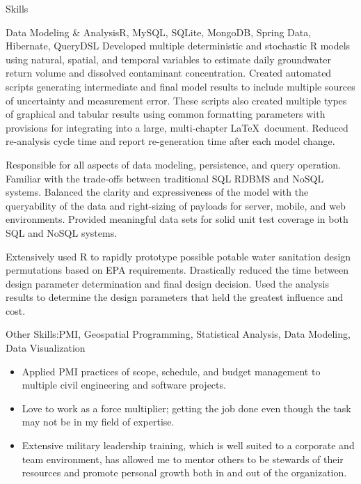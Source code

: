 \documentclass[]{mcdowellcv}
\begin{document}
\begin{cvsection}{Skills}
	\begin{cvsubsection2}{Data Modeling \& Analysis}{\textsf{R}, MySQL, SQLite, MongoDB, Spring Data, Hibernate, QueryDSL}
		 Developed multiple deterministic and stochastic \textsf{R} models using natural, spatial, and temporal variables to estimate daily groundwater return volume and dissolved contaminant concentration.  Created automated scripts generating intermediate and final model results to include multiple sources of uncertainty and measurement error.  These scripts also created multiple types of graphical and tabular results using common formatting parameters with provisions for integrating into a large, multi-chapter \LaTeX\ document.  
		 Reduced re-analysis cycle time and report re-generation time after each model change.
		
		 Responsible for all aspects of data modeling, persistence, and query operation.  Familiar with the trade-offs between traditional SQL RDBMS and NoSQL systems. 
		  Balanced the clarity and expressiveness of the model with the queryability of the data and right-sizing of payloads for server, mobile, and web environments.  Provided meaningful data sets for solid unit test coverage in both SQL and NoSQL systems.
		
		  Extensively used \textsf{R} to rapidly prototype possible potable water sanitation  design permutations based on EPA requirements. 
		 Drastically reduced the time between design parameter determination and final design decision.  Used the analysis results to determine the design parameters that held the greatest influence and cost.
	\end{cvsubsection2}
	
	\clearpage
	
	\begin{cvsubsection2}{Other Skills:}{PMI, Geospatial Programming, Statistical Analysis, Data Modeling, Data Visualization}
		\begin{itemize}
			\item Applied PMI practices of scope, schedule, and budget management to multiple civil engineering and software projects.
			\item Love to work as a force multiplier; getting the job done even though the task may not be in my field of expertise.
			\item Extensive military leadership training, which is well suited to a corporate and team environment, has allowed me to mentor others to be stewards of their resources and promote personal growth both in and out of the organization.
		\end{itemize}
	\end{cvsubsection2}
\end{cvsection}
\end{document}
